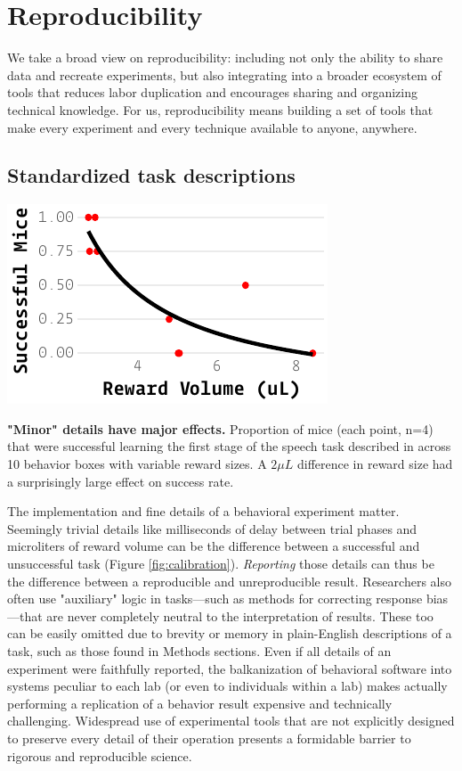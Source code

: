 \section{Reproducibility}
\label{sec:reproducibility}

We take a broad view on reproducibility: including not only the ability to share data and recreate experiments, but also integrating into a broader ecosystem of tools that reduces labor duplication and encourages sharing and organizing technical knowledge. For us, reproducibility means building a set of tools that make every experiment and every technique available to anyone, anywhere.

\subsection{Standardized task descriptions}

\begin{marginfigure}[1.75cm]
\includegraphics[]{figures/calibration_warning.pdf}
\caption{\textbf{"Minor" details have major effects.} Proportion of mice (each point, n=4) that were successful learning the first stage of the speech task described in \citep{saundersMiceCanLearn2019} across 10 behavior boxes with variable reward sizes. A $2 \mu L$ difference in reward size had a surprisingly large effect on success rate.}
\label{fig:calibration}
\end{marginfigure}

The implementation and fine details of a behavioral experiment matter. Seemingly trivial details like milliseconds of delay between trial phases and microliters of reward volume can be the difference between a successful and unsuccessful task (Figure \ref{fig:calibration}). \textit{Reporting} those details can thus be the difference between a reproducible and unreproducible result.  Researchers also often use "auxiliary" logic in tasks---such as methods for correcting response bias---that are never completely neutral to the interpretation of results. These too can be easily omitted due to brevity or memory in plain-English descriptions of a task, such as those found in Methods sections. Even if all details of an experiment were faithfully reported, the balkanization of behavioral software into systems peculiar to each lab (or even to individuals within a lab) makes actually performing a replication of a behavior result expensive and technically challenging. Widespread use of experimental tools that are not explicitly designed to preserve every detail of their operation presents a formidable barrier to rigorous and reproducible science\citep{wallReliabilityStartsExperimental2019}.

